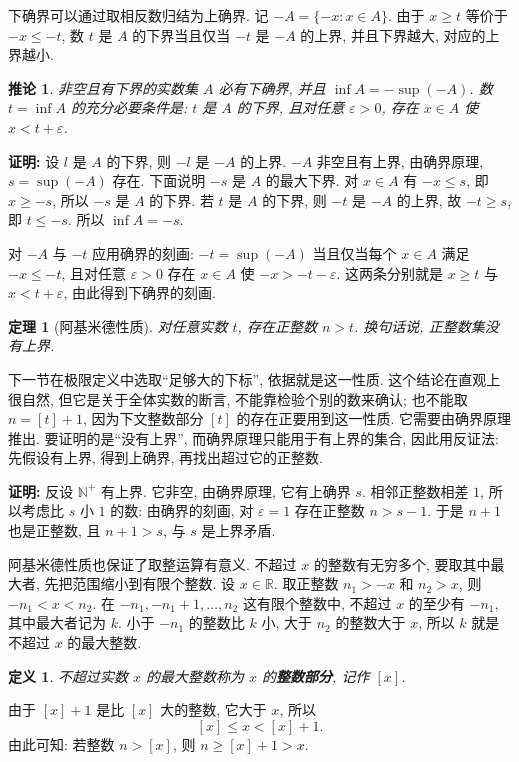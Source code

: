 \documentclass[UTF8,openany]{ctexbook}
\theoremstyle{chinesetextbook}
\newtheorem{definition}{定义}[section]
\newtheorem{theorem}{定理}[section]
\newenvironment{cnproof}{\par\indent\textbf{证明:} \ignorespaces}{\par}
\newtheorem*{corollarysingle}{推论}
\begin{document}
下确界可以通过取相反数归结为上确界. 记 $-A=\{-x:x\in A\}$. 由于 $x\ge t$ 等价于 $-x\le-t$, 数 $t$ 是 $A$ 的下界当且仅当 $-t$ 是 $-A$ 的上界, 并且下界越大, 对应的上界越小.
\begin{corollarysingle}
非空且有下界的实数集 $A$ 必有下确界, 并且 $\inf A=-\sup(-A)$. 数 $t=\inf A$ 的充分必要条件是: $t$ 是 $A$ 的下界, 且对任意 $\varepsilon>0$, 存在 $x\in A$ 使 $x<t+\varepsilon$.
\end{corollarysingle}
\begin{cnproof}
设 $l$ 是 $A$ 的下界, 则 $-l$ 是 $-A$ 的上界. $-A$ 非空且有上界, 由确界原理, $s=\sup(-A)$ 存在. 下面说明 $-s$ 是 $A$ 的最大下界. 对 $x\in A$ 有 $-x\le s$, 即 $x\ge-s$, 所以 $-s$ 是 $A$ 的下界. 若 $t$ 是 $A$ 的下界, 则 $-t$ 是 $-A$ 的上界, 故 $-t\ge s$, 即 $t\le-s$. 所以 $\inf A=-s$.

对 $-A$ 与 $-t$ 应用确界的刻画: $-t=\sup(-A)$ 当且仅当每个 $x\in A$ 满足 $-x\le-t$, 且对任意 $\varepsilon>0$ 存在 $x\in A$ 使 $-x>-t-\varepsilon$. 这两条分别就是 $x\ge t$ 与 $x<t+\varepsilon$, 由此得到下确界的刻画.
\end{cnproof}
\begin{theorem}[阿基米德性质]
对任意实数 $t$, 存在正整数 $n>t$. 换句话说, 正整数集没有上界.
\end{theorem}
下一节在极限定义中选取“足够大的下标”, 依据就是这一性质. 这个结论在直观上很自然, 但它是关于全体实数的断言, 不能靠检验个别的数来确认; 也不能取 $n=[t]+1$, 因为下文整数部分 $[t]$ 的存在正要用到这一性质. 它需要由确界原理推出. 要证明的是“没有上界”, 而确界原理只能用于有上界的集合, 因此用反证法: 先假设有上界, 得到上确界, 再找出超过它的正整数.
\begin{cnproof}
反设 $\mathbb N^+$ 有上界. 它非空, 由确界原理, 它有上确界 $s$. 相邻正整数相差 $1$, 所以考虑比 $s$ 小 $1$ 的数: 由确界的刻画, 对 $\varepsilon=1$ 存在正整数 $n>s-1$. 于是 $n+1$ 也是正整数, 且 $n+1>s$, 与 $s$ 是上界矛盾.
\end{cnproof}
阿基米德性质也保证了取整运算有意义. 不超过 $x$ 的整数有无穷多个, 要取其中最大者, 先把范围缩小到有限个整数. 设 $x\in\mathbb R$. 取正整数 $n_1>-x$ 和 $n_2>x$, 则 $-n_1<x<n_2$. 在 $-n_1,-n_1+1,\ldots,n_2$ 这有限个整数中, 不超过 $x$ 的至少有 $-n_1$, 其中最大者记为 $k$. 小于 $-n_1$ 的整数比 $k$ 小, 大于 $n_2$ 的整数大于 $x$, 所以 $k$ 就是不超过 $x$ 的最大整数.
\begin{definition}
不超过实数 $x$ 的最大整数称为 $x$ 的\textbf{整数部分}, 记作 $[x]$.
\end{definition}
由于 $[x]+1$ 是比 $[x]$ 大的整数, 它大于 $x$, 所以
\[
[x]\le x<[x]+1.
\]
由此可知: 若整数 $n>[x]$, 则 $n\ge[x]+1>x$.
\end{document}
